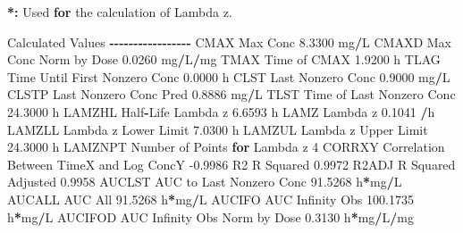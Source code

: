 \documentclass[
  10pt,
]{krantz}
\makeatletter
\newenvironment{Shaded}{\begin{snugshade}}{\end{snugshade}}
\newcommand{\ControlFlowTok}[1]{\textcolor[rgb]{0.13,0.29,0.53}{\textbf{#1}}}
\newcommand{\DecValTok}[1]{\textcolor[rgb]{0.00,0.00,0.81}{#1}}
\newcommand{\ErrorTok}[1]{\textcolor[rgb]{0.64,0.00,0.00}{\textbf{#1}}}
\newcommand{\FloatTok}[1]{\textcolor[rgb]{0.00,0.00,0.81}{#1}}
\newcommand{\NormalTok}[1]{#1}
\newcommand{\OperatorTok}[1]{\textcolor[rgb]{0.81,0.36,0.00}{\textbf{#1}}}
\newcommand{\StringTok}[1]{\textcolor[rgb]{0.31,0.60,0.02}{#1}}
\newenvironment{kframe}{%
\medskip{}
\setlength{\fboxsep}{.8em}
 \def\at@end@of@kframe{}%
 \ifinner\ifhmode%
  \def\at@end@of@kframe{\end{minipage}}%
  \begin{minipage}{\columnwidth}%
 \fi\fi%
 \def\FrameCommand##1{\hskip\@totalleftmargin \hskip-\fboxsep
 \colorbox{shadecolor}{##1}\hskip-\fboxsep
     \hskip-\linewidth \hskip-\@totalleftmargin \hskip\columnwidth}%
 \MakeFramed {\advance\hsize-\width
   \@totalleftmargin\z@ \linewidth\hsize
   \@setminipage}}%
 {\par\unskip\endMakeFramed%
 \at@end@of@kframe}
\renewenvironment{Shaded}{\begin{kframe}}{\end{kframe}}
\makeatother
\begin{document}
\begin{Shaded}
\begin{Highlighting}[]
\OperatorTok{*}\ErrorTok{:}\StringTok{ }\NormalTok{Used }\ControlFlowTok{for}\NormalTok{ the calculation of Lambda z.}


\NormalTok{Calculated Values}
\OperatorTok{{-}{-}{-}{-}{-}{-}{-}{-}{-}{-}{-}{-}{-}{-}{-}{-}{-}}
\NormalTok{CMAX       Max Conc                                        }\FloatTok{8.3300}\NormalTok{ mg}\OperatorTok{/}\NormalTok{L}
\NormalTok{CMAXD      Max Conc Norm by Dose                           }\FloatTok{0.0260}\NormalTok{ mg}\OperatorTok{/}\NormalTok{L}\OperatorTok{/}\NormalTok{mg}
\NormalTok{TMAX       Time of CMAX                                    }\FloatTok{1.9200}\NormalTok{ h}
\NormalTok{TLAG       Time Until First Nonzero Conc                   }\FloatTok{0.0000}\NormalTok{ h}
\NormalTok{CLST       Last Nonzero Conc                               }\FloatTok{0.9000}\NormalTok{ mg}\OperatorTok{/}\NormalTok{L}
\NormalTok{CLSTP      Last Nonzero Conc Pred                          }\FloatTok{0.8886}\NormalTok{ mg}\OperatorTok{/}\NormalTok{L}
\NormalTok{TLST       Time of Last Nonzero Conc                      }\FloatTok{24.3000}\NormalTok{ h}
\NormalTok{LAMZHL     Half}\OperatorTok{{-}}\NormalTok{Life Lambda z                              }\FloatTok{6.6593}\NormalTok{ h}
\NormalTok{LAMZ       Lambda z                                        }\FloatTok{0.1041} \OperatorTok{/}\NormalTok{h}
\NormalTok{LAMZLL     Lambda z Lower Limit                            }\FloatTok{7.0300}\NormalTok{ h}
\NormalTok{LAMZUL     Lambda z Upper Limit                           }\FloatTok{24.3000}\NormalTok{ h}
\NormalTok{LAMZNPT    Number of Points }\ControlFlowTok{for}\NormalTok{ Lambda z                   }\DecValTok{4}
\NormalTok{CORRXY     Correlation Between TimeX and Log ConcY        }\FloatTok{{-}0.9986} 
\NormalTok{R2         R Squared                                       }\FloatTok{0.9972} 
\NormalTok{R2ADJ      R Squared Adjusted                              }\FloatTok{0.9958} 
\NormalTok{AUCLST     AUC to Last Nonzero Conc                       }\FloatTok{91.5268}\NormalTok{ h}\OperatorTok{*}\NormalTok{mg}\OperatorTok{/}\NormalTok{L}
\NormalTok{AUCALL     AUC All                                        }\FloatTok{91.5268}\NormalTok{ h}\OperatorTok{*}\NormalTok{mg}\OperatorTok{/}\NormalTok{L}
\NormalTok{AUCIFO     AUC Infinity Obs                              }\FloatTok{100.1735}\NormalTok{ h}\OperatorTok{*}\NormalTok{mg}\OperatorTok{/}\NormalTok{L}
\NormalTok{AUCIFOD    AUC Infinity Obs Norm by Dose                   }\FloatTok{0.3130}\NormalTok{ h}\OperatorTok{*}\NormalTok{mg}\OperatorTok{/}\NormalTok{L}\OperatorTok{/}\NormalTok{mg}

\end{Highlighting}
\end{Shaded}
\end{document}
